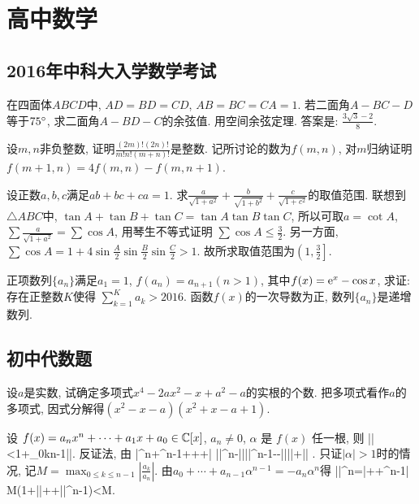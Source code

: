 \chapter{高中数学}


\section{2016年中科大入学数学考试}
\bq{}{}
在四面体$ABCD$中, $AD=BD=CD$, $AB=BC=CA=1$. 若二面角$A-BC-D$等于$75^\circ$, 求二面角$A-BD-C$的余弦值.
\eq
\ba
用空间余弦定理. 答案是: $\frac{3\sqrt{3}-2}{8}$.
\ea

\bq{}{}
设$m,n$非负整数, 证明$\frac{(2m)!(2n)!}{m!n!(m+n)!}$是整数.
\eq
\ba
记所讨论的数为$f(m,n)$, 对$m$归纳证明$f(m+1,n)=4f(m,n)-f(m,n+1)$.
\ea

\bq{}{}
设正数$a, b, c$满足$ab+bc+ca=1$. 求$\frac{a}{\sqrt{1+a^2}}+\frac{b}{\sqrt{1+b^2}}+\frac{c}{\sqrt{1+c^2}}$的取值范围.
\eq
\ba
联想到$\triangle ABC$中, $\tan A+\tan B+\tan C=\tan A\tan B\tan C$,
所以可取$a=\cot A$, $\sum\frac{a}{\sqrt{1+a^2}}=\sum\cos A$, 用琴生不等式证明
$\sum\cos A\le\frac32$. 另一方面, $\sum\cos A=1+4\sin\frac{A}{2}\sin\frac{B}{2}\sin\frac{C}{2}>1$.
故所求取值范围为$\left(1,\frac32\right]$.
\ea

\bq{}{}
正项数列$\{a_n\}$满足$a_1=1$, $f(a_n)=a_{n+1}(n>1)$, 其中$f(x)=\mathrm{e}^x-\cos x$, 求证: 存在正整数$K$使得
$\sum\limits_{k=1}^{K}a_{k}>2016$.
\eq
\ba
函数$f(x)$的一次导数为正, 数列$\{a_{n}\}$是递增数列.
\ea


\section{初中代数题}
\bq{}{}
设$a$是实数, 试确定多项式$x^4-2ax^2-x+a^2-a$的实根的个数.
\eq
\ba
把多项式看作$a$的多项式, 因式分解得$(x^2-x-a)(x^2+x-a+1)$.
\ea

设 $f(x)=a_nx^n+\cdots+a_1x+a_0\in\mathbb{C}[x]$, $a_n\ne0$, $\alpha$ 是 $f(x)$ 任一根, 则
\bee
|\alpha|<1+\max_{0\le k\le n-1}\left|\right|.
\eee
\eq
\ba
反证法, 由
\bee
 \left|\alpha^n+\alpha^{n-1}+\cdots+\alpha+\right|
 \ge |\alpha|^n-\left|\right|\cdot|\alpha|^{n-1}-\cdots-\left|\right|\cdot|\alpha|+\left|\right|
 .
\eee
\ea
\ba
只证$|\alpha|>1$时的情况, 记$M=\max_{0\le k\le n-1}\left|\frac{a_k}{a_n}\right|$. 由$a_0+\cdots+a_{n-1}\alpha^{n-1}=-a_{n}\alpha^n$得
\bee
|\alpha|^n=\left|+\cdots+\alpha^{n-1}\right|
\le M(1+|\alpha|+\cdots+|\alpha|^{n-1})<M.
\eee
\ea

